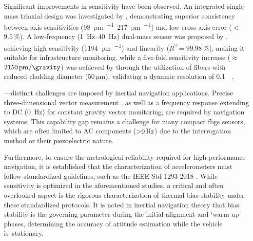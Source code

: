 \documentclass[sensors,article,accept,pdftex,moreauthors]{Definitions/mdpi}
\begin{document}
Significant improvements in sensitivity have been observed. An integrated single-mass triaxial design was investigated by \citet{Liu2025}, demonstrating superior consistency between {axis} sensitivities (\SIrange{98}{217}{\pico\meter\per\gravity}) and low cross-axis error ($<$$\SI{9.5}{\%}$). A low-frequency (\SIrange{1}{40}{\hertz}) dual-mass sensor was proposed by \citet{Qiu2023}, achieving high sensitivity (\SI{1194}{\pico\meter\per\gravity}) and linearity ($R^2 = \SI{99.98}{\percent}$), making it suitable for infrastructure monitoring.
 while a five-fold sensitivity increase ($\approx$$\SI{2150}{\pico\meter\per\gravity}$) was achieved by \citet{Chen2021} through the utilization of fibers with reduced cladding diameter ($\SI{50}{\micro\meter}$), validating a dynamic resolution of \SI{0.1}{\milli\gravity}.

---distinct challenges are imposed by inertial navigation applications. Precise three-dimensional vector measurement \citep{Wang2023}, as well as a frequency response extending to DC (\SI{0}{\hertz}) for constant gravity vector monitoring, are required by navigation systems. This capability gap remains a challenge for many compact \glspl{fbg} sensors, which are often limited to AC components ($\SI{>0}{\hertz}$) due to the interrogation method or their piezoelectric nature.

Furthermore, to ensure the metrological reliability required for high-performance navigation, it is established that the characterization of accelerometers must follow standardized guidelines, such as the IEEE Std 1293-2018 \citep{IEEE1998}. While sensitivity is optimized in the aforementioned studies, a critical and often overlooked aspect is the rigorous characterization of thermal bias stability under these standardized protocols. It is noted in inertial navigation theory that bias stability is the governing parameter during the initial alignment and `warm-up' phases, determining the accuracy of attitude estimation while the vehicle is~stationary.
\end{document}
